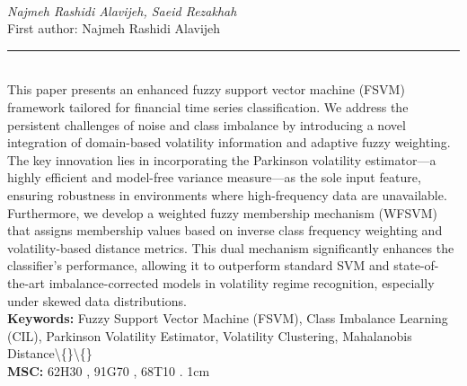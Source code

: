 \documentclass[10pt,twoside]{article}
\begin{document}
\noindent\begin{minipage}[t][\textheight]{\textwidth}
\\[0.35em]
{\itshape Najmeh Rashidi Alavijeh, Saeid Rezakhah}\\[0.2em]
{\footnotesize First author: Najmeh Rashidi Alavijeh}\\[0.45em]
\noindent\rule{\textwidth}{0.3pt}\\[0.4em]
{\footnotesize  This paper presents an enhanced fuzzy support vector machine (FSVM) framework tailored for financial time series classification. We address the persistent challenges of noise and class imbalance by introducing a novel integration of domain-based volatility information and adaptive fuzzy weighting. The key innovation lies in incorporating the Parkinson volatility estimator---a highly efficient and model-free variance measure---as the sole input feature, ensuring robustness in environments where high-frequency data are unavailable. Furthermore, we develop a weighted fuzzy membership mechanism (WFSVM) that assigns membership values based on inverse class frequency weighting and volatility-based distance metrics. This dual mechanism significantly enhances the classifier's performance, allowing it to outperform standard SVM and state-of-the-art imbalance-corrected models in volatility regime recognition, especially under skewed data distributions.}\\[0.4em]
{\footnotesize\bfseries Keywords:} {\footnotesize Fuzzy Support Vector Machine (FSVM), Class Imbalance Learning (CIL), Parkinson Volatility Estimator, Volatility Clustering, Mahalanobis Distance\textbackslash\{\}\textbackslash\{\}}\\[0.15em]
{\footnotesize\bfseries MSC:} {\footnotesize 62H30 , 91G70 , 68T10 . 1cm}\\
\vfill
\end{minipage}
\newpage
\end{document}

